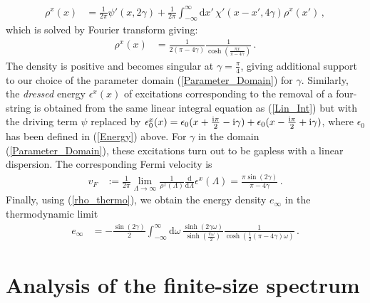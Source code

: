 \documentclass[12pt]{article}
\numberwithin{equation}{section}
\newcommand{\ri}{{\rm i}}
\begin{document}
\begin{align}
    \rho^x(x)&=\frac{1}{2\pi} \psi'(x,2\gamma)+\frac{1}{2\pi}\int^{\infty}_{-\infty}\mathrm{d }x'\, 
    \chi'(x-x',4\gamma)
    \rho^x(x')\,,
    \label{Lin_Int}
\end{align}
which is solved by Fourier transform giving: 
\begin{align}
\label{rho_thermo}
    \rho^x(x)&=\frac{1}{2(\pi-4\gamma)}\frac{1}{\cosh(\frac{\pi x}{\pi-4\gamma})}\,.
\end{align}
The density is positive and becomes singular at $\gamma=\tfrac{\pi}{4}$, giving additional  support to our choice of the parameter domain (\ref{Parameter_Domain}) for $\gamma$. 
Similarly, the \emph{dressed} energy $\epsilon^x(x)$ of excitations corresponding to  the removal of a four-string is obtained from the same linear integral equation as (\ref{Lin_Int}) but with the driving term $\psi$ replaced by  $\epsilon^x_0(x)=\epsilon_0(x+\frac{\ri \pi}{2}-\ri \gamma)+\epsilon_0(x-\frac{\ri \pi}{2}+\ri \gamma)$, where $\epsilon_0$ has been defined in (\ref{Energy}) above.  For $\gamma$ in the domain (\ref{Parameter_Domain}), these excitations turn out to be gapless with a linear dispersion. The corresponding Fermi velocity is
\begin{align}
    v_F&:= \frac{1}{2\pi }\lim_{\Lambda\to \infty} \frac{1}{\rho^x(\Lambda)}\frac{\mathrm{d}}{\mathrm{d}\Lambda}\epsilon^x(\Lambda)=\frac{\pi \sin(2\gamma)}{\pi-4\gamma }\,. \label{vF}
\end{align}
Finally, using (\ref{rho_thermo}), we obtain the energy density $e_\infty$ in the thermodynamic limit
\begin{align}
    e_\infty&=-\frac{\sin(2\gamma)}{2}\int^{\infty}_{-\infty}\mathrm{d}\omega  \, \frac{ \sinh (2 \gamma  \omega )}{\sinh \left(\frac{\pi  \omega }{2}\right)} \frac{1}{\cosh(\frac{1}{2} (\pi -4 \gamma ) \omega)} \,. \label{einf}
\end{align}


\section{Analysis of the finite-size spectrum}\label{sec:fsize}
\end{document}
